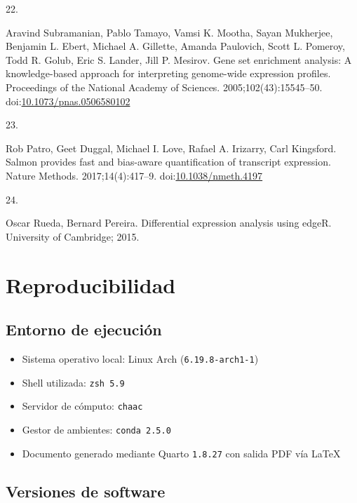 \documentclass[
  12pt,
  letterpaper,
  DIV=11,
  numbers=noendperiod]{scrartcl}
\newlength{\cslhangindent}
\newlength{\csllabelwidth}
\newenvironment{CSLReferences}[2] %
 {\begin{list}{}{%
  \setlength{\itemindent}{0pt}
  \setlength{\leftmargin}{0pt}
  \setlength{\parsep}{0pt}
  \ifodd #1
   \setlength{\leftmargin}{\cslhangindent}
   \setlength{\itemindent}{-1\cslhangindent}
  \fi
  \setlength{\itemsep}{#2\baselineskip}}}
 {\end{list}}
\newcommand{\CSLLeftMargin}[1]{\parbox[t]{\csllabelwidth}{\strut#1\strut}}
\newcommand{\CSLRightInline}[1]{\parbox[t]{\linewidth - \csllabelwidth}{\strut#1\strut}}
\providecommand{\tightlist}{%
  \setlength{\itemsep}{0pt}\setlength{\parskip}{0pt}}
\begin{document}
\begin{CSLReferences}{0}{1}
\CSLLeftMargin{22. }%
\CSLRightInline{Aravind Subramanian, Pablo Tamayo, Vamsi K. Mootha,
Sayan Mukherjee, Benjamin L. Ebert, Michael A. Gillette, Amanda
Paulovich, Scott L. Pomeroy, Todd R. Golub, Eric S. Lander, Jill P.
Mesirov. Gene set enrichment analysis: A knowledge-based approach for
interpreting genome-wide expression profiles. Proceedings of the
National Academy of Sciences. 2005;102(43):15545--50.
doi:\href{https://doi.org/10.1073/pnas.0506580102}{10.1073/pnas.0506580102}}

\CSLLeftMargin{23. }%
\CSLRightInline{Rob Patro, Geet Duggal, Michael I. Love, Rafael A.
Irizarry, Carl Kingsford. Salmon provides fast and bias-aware
quantification of transcript expression. Nature Methods.
2017;14(4):417--9.
doi:\href{https://doi.org/10.1038/nmeth.4197}{10.1038/nmeth.4197}}

\CSLLeftMargin{24. }%
\CSLRightInline{Oscar Rueda, Bernard Pereira. Differential expression
analysis using edgeR. University of Cambridge; 2015.}

\end{CSLReferences}

\newpage

\section{Reproducibilidad}\label{reproducibilidad}

\subsection{Entorno de ejecución}\label{entorno-de-ejecuciuxf3n}

\begin{itemize}
\tightlist
\item
  Sistema operativo local: Linux Arch (\texttt{6.19.8-arch1-1})
\item
  Shell utilizada: \texttt{zsh\ 5.9}
\item
  Servidor de cómputo: \texttt{chaac}
\item
  Gestor de ambientes: \texttt{conda\ 2.5.0}
\item
  Documento generado mediante Quarto \texttt{1.8.27} con salida PDF vía
  LaTeX
\end{itemize}

\subsection{Versiones de software}\label{versiones-de-software}
\end{document}
